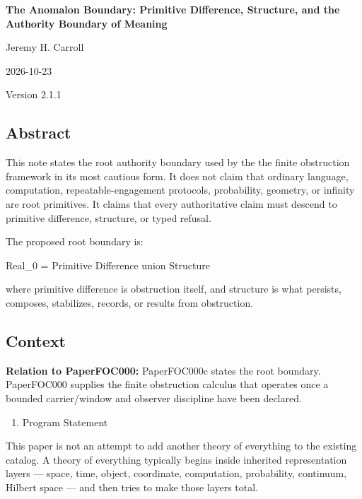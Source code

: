 \documentclass[
  10pt,
]{article}
\author{}
\date{}
\newenvironment{Shaded}{}{}
\newcommand{\NormalTok}[1]{#1}
\providecommand{\tightlist}{%
  \setlength{\itemsep}{0pt}\setlength{\parskip}{0pt}}
\providecommand{\tightlist}{%
  \setlength{\itemsep}{0pt}\setlength{\parskip}{0pt}}
\begin{document}
\begin{center}
{\LARGE\bfseries The Anomalon Boundary: Primitive Difference, Structure, and the
Authority Boundary of Meaning\par}
Jeremy H. Carroll\par
2026-10-23\par
Version 2.1.1\par
\end{center}

\subsection{Abstract}\label{abstract}

This note states the root authority boundary used by the the finite obstruction framework in its most cautious form. It does not claim that ordinary language, computation, repeatable-engagement protocols, probability, geometry, or infinity are root primitives. It claims that every authoritative claim must descend to primitive difference, structure, or typed refusal.

The proposed root boundary is:

\begin{Shaded}
\begin{Highlighting}[]
\NormalTok{Real\_0 = Primitive Difference union Structure}
\end{Highlighting}
\end{Shaded}

where primitive difference is obstruction itself, and structure is what persists, composes, stabilizes, records, or results from obstruction.

\subsection{Context}\label{context}

\textbf{Relation to PaperFOC000:} PaperFOC000c states the root boundary. PaperFOC000 supplies the finite obstruction calculus that operates once a bounded carrier/window and observer discipline have been declared.

\begin{enumerate}
\def\labelenumi{\arabic{enumi}.}
\setcounter{enumi}{-1}
\tightlist
\item
  Program Statement
\end{enumerate}

This paper is not an attempt to add another theory of everything to the existing catalog. A theory of everything typically begins inside inherited representation layers --- space, time, object, coordinate, computation, probability, continuum, Hilbert space --- and then tries to make those layers total.
\end{document}
